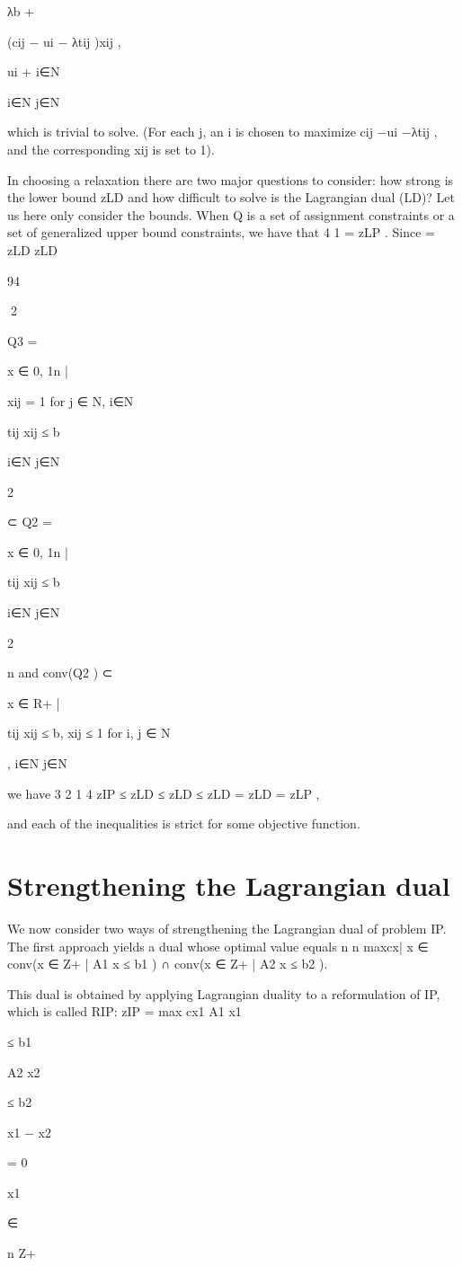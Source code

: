 λb +

(cij − ui − λtij )xij ,

ui +
i∈N

i∈N j∈N

which is trivial to solve. (For each j, an i is chosen to maximize cij −ui −λtij , and the corresponding
xij is set to 1).

In choosing a relaxation there are two major questions to consider: how strong is the lower bound zLD
and how difficult to solve is the Lagrangian dual (LD)? Let us here only consider the bounds.
When Q is a set of assignment constraints or a set of generalized upper bound constraints, we have that
4
1
= zLP . Since
= zLD
zLD

94

2

Q3 = {x ∈ {0, 1}n |

xij = 1 for j ∈ N,
i∈N

tij xij ≤ b}
i∈N j∈N

2

⊂ Q2 = {x ∈ {0, 1}n |

tij xij ≤ b}
i∈N j∈N

2

n
and conv(Q2 ) ⊂ {x ∈ R+
|

tij xij ≤ b, xij ≤ 1 for i, j ∈ N },
i∈N j∈N

we have
3
2
1
4
zIP ≤ zLD
≤ zLD
≤ zLD
= zLD
= zLP ,

and each of the inequalities is strict for some objective function.

\section{Strengthening the Lagrangian dual}

We now consider two ways of strengthening the Lagrangian dual of problem IP. The first approach yields
a dual whose optimal value equals
n
n
max{cx| x ∈ conv(x ∈ Z+
| A1 x ≤ b1 ) ∩ conv(x ∈ Z+
| A2 x ≤ b2 )}.

This dual is obtained by applying Lagrangian duality to a reformulation of IP, which is called RIP:
zIP = max cx1
A1 x1

≤ b1

A2 x2

≤ b2

x1 − x2

= 0

x1

∈

n
Z+

